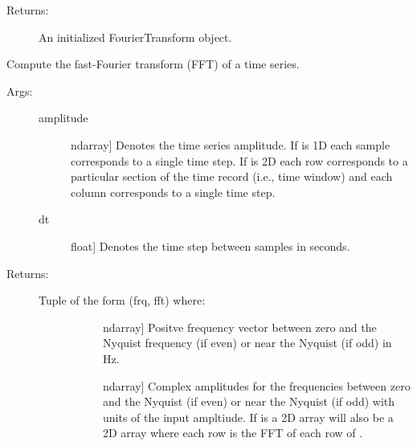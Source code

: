 \documentclass[letterpaper,10pt,english]{sphinxmanual}
\begin{document}
\begin{fulllineitems}
\begin{fulllineitems}
\begin{description}
\begin{description}
\end{description}

\item[{Returns:}] \leavevmode
An initialized FourierTransform object.

\end{description}

\end{fulllineitems}


\begin{fulllineitems}
\label{\detokenize{index:sigpropy.FourierTransform.fft}}
Compute the fast-Fourier transform (FFT) of a time series.
\begin{description}
\item[{Args:}] \leavevmode\begin{description}
\item[{amplitude}] \leavevmode{[}ndarray{]}
Denotes the time series amplitude. If  is 1D
each sample corresponds to a single time step. If
 is 2D each row corresponds to a particular
section of the time record (i.e., time window) and each
column corresponds to a single time step.

\item[{dt}] \leavevmode{[}float{]}
Denotes the time step between samples in seconds.

\end{description}

\item[{Returns:}] \leavevmode\begin{description}
\item[{Tuple of the form (frq, fft) where:}] \leavevmode\begin{description}
\item[{}] \leavevmode{[}ndarray{]}
Positve frequency vector between zero and the
Nyquist frequency (if even) or near the Nyquist
(if odd) in Hz.

\item[{}] \leavevmode{[}ndarray{]}
Complex amplitudes for the frequencies between zero
and the Nyquist (if even) or near the Nyquist 
(if odd) with units of the input ampltiude.
If  is a 2D array  will also be a 2D
array where each row is the FFT of each row of 
.


\end{description}
\end{description}
\end{description}
\end{fulllineitems}
\end{fulllineitems}
\end{document}
